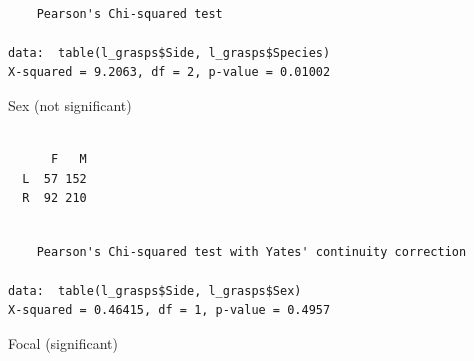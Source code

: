 \documentclass[
  letterpaper,
  DIV=11,
  numbers=noendperiod]{scrartcl}
\newenvironment{Shaded}{\begin{snugshade}}{\end{snugshade}}
\newcommand{\FunctionTok}[1]{\textcolor[rgb]{0.28,0.35,0.67}{#1}}
\newcommand{\NormalTok}[1]{\textcolor[rgb]{0.00,0.23,0.31}{#1}}
\newcommand{\SpecialCharTok}[1]{\textcolor[rgb]{0.37,0.37,0.37}{#1}}
\begin{document}
\begin{Shaded}
\end{Shaded}

\begin{verbatim}

    Pearson's Chi-squared test

data:  table(l_grasps$Side, l_grasps$Species)
X-squared = 9.2063, df = 2, p-value = 0.01002
\end{verbatim}

Sex (not significant)

\begin{Shaded}
\end{Shaded}

\begin{verbatim}
   
      F   M
  L  57 152
  R  92 210
\end{verbatim}

\begin{Shaded}
\end{Shaded}

\begin{verbatim}

    Pearson's Chi-squared test with Yates' continuity correction

data:  table(l_grasps$Side, l_grasps$Sex)
X-squared = 0.46415, df = 1, p-value = 0.4957
\end{verbatim}

Focal (significant)

\begin{Shaded}
\end{Shaded}
\end{document}
